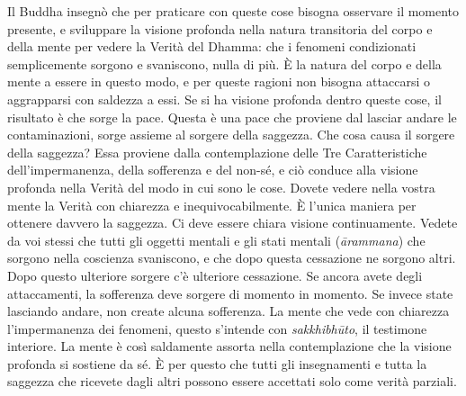 Il Buddha insegnò che per praticare con queste cose bisogna osservare il
momento presente, e sviluppare la visione profonda nella natura
transitoria del corpo e della mente per vedere la Verità del Dhamma: che
i fenomeni condizionati semplicemente sorgono e svaniscono, nulla di
più. È la natura del corpo e della mente a essere in questo modo, e per
queste ragioni non bisogna attaccarsi o aggrapparsi con saldezza a essi.
Se si ha visione profonda dentro queste cose, il risultato è che sorge
la pace. Questa è una pace che proviene dal lasciar andare le
contaminazioni, sorge assieme al sorgere della saggezza. Che cosa causa
il sorgere della saggezza? Essa proviene dalla contemplazione delle Tre
Caratteristiche dell'impermanenza, della sofferenza e del non-sé, e ciò
conduce alla visione profonda nella Verità del modo in cui sono le cose.
Dovete vedere nella vostra mente la Verità con chiarezza e
inequivocabilmente. È l'unica maniera per ottenere davvero la saggezza.
Ci deve essere chiara visione continuamente. Vedete da voi stessi che
tutti gli oggetti mentali e gli stati mentali (\emph{ārammana}) che
sorgono nella coscienza svaniscono, e che dopo questa cessazione ne
sorgono altri. Dopo questo ulteriore sorgere c'è ulteriore cessazione.
Se ancora avete degli attaccamenti, la sofferenza deve sorgere di
momento in momento. Se invece state lasciando andare, non create alcuna
sofferenza. La mente che vede con chiarezza l'impermanenza dei fenomeni,
questo s'intende con \emph{sakkhibhūto}, il testimone interiore. La
mente è così saldamente assorta nella contemplazione che la visione
profonda si sostiene da sé. È per questo che tutti gli insegnamenti e
tutta la saggezza che ricevete dagli altri possono essere accettati solo
come verità parziali.

